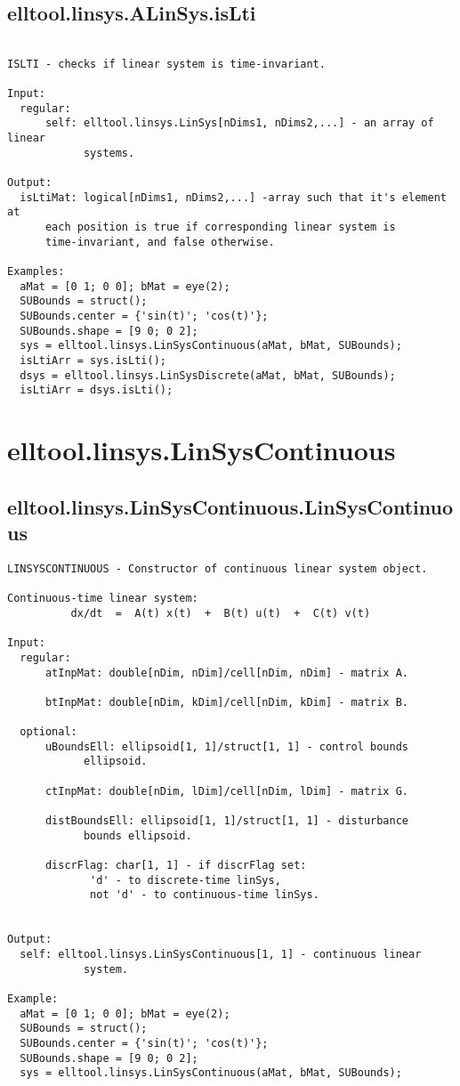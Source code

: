 \subsection{\texorpdfstring{elltool.linsys.ALinSys.isLti}{isLti}}\label{method:elltool.linsys.ALinSys.isLti}
\begin{verbatim}

ISLTI - checks if linear system is time-invariant.

Input:
  regular:
      self: elltool.linsys.LinSys[nDims1, nDims2,...] - an array of linear
            systems.

Output:
  isLtiMat: logical[nDims1, nDims2,...] -array such that it's element at
      each position is true if corresponding linear system is
      time-invariant, and false otherwise.

Examples:
  aMat = [0 1; 0 0]; bMat = eye(2);
  SUBounds = struct();
  SUBounds.center = {'sin(t)'; 'cos(t)'};
  SUBounds.shape = [9 0; 0 2];
  sys = elltool.linsys.LinSysContinuous(aMat, bMat, SUBounds);
  isLtiArr = sys.isLti();
  dsys = elltool.linsys.LinSysDiscrete(aMat, bMat, SUBounds);
  isLtiArr = dsys.isLti();
\end{verbatim}
\section{elltool.linsys.LinSysContinuous}\label{secClassDescr:elltool.linsys.LinSysContinuous}
\subsection{\texorpdfstring{elltool.linsys.LinSysContinuous.LinSysContinuous}{LinSysContinuous}}\label{method:elltool.linsys.LinSysContinuous.LinSysContinuous}
\begin{verbatim}
LINSYSCONTINUOUS - Constructor of continuous linear system object.

Continuous-time linear system:
          dx/dt  =  A(t) x(t)  +  B(t) u(t)  +  C(t) v(t)

Input:
  regular:
      atInpMat: double[nDim, nDim]/cell[nDim, nDim] - matrix A.

      btInpMat: double[nDim, kDim]/cell[nDim, kDim] - matrix B.

  optional:
      uBoundsEll: ellipsoid[1, 1]/struct[1, 1] - control bounds
            ellipsoid.

      ctInpMat: double[nDim, lDim]/cell[nDim, lDim] - matrix G.

      distBoundsEll: ellipsoid[1, 1]/struct[1, 1] - disturbance
            bounds ellipsoid.

      discrFlag: char[1, 1] - if discrFlag set:
             'd' - to discrete-time linSys,
             not 'd' - to continuous-time linSys.


Output:
  self: elltool.linsys.LinSysContinuous[1, 1] - continuous linear
            system.

Example:
  aMat = [0 1; 0 0]; bMat = eye(2);
  SUBounds = struct();
  SUBounds.center = {'sin(t)'; 'cos(t)'};
  SUBounds.shape = [9 0; 0 2];
  sys = elltool.linsys.LinSysContinuous(aMat, bMat, SUBounds);
\end{verbatim}


